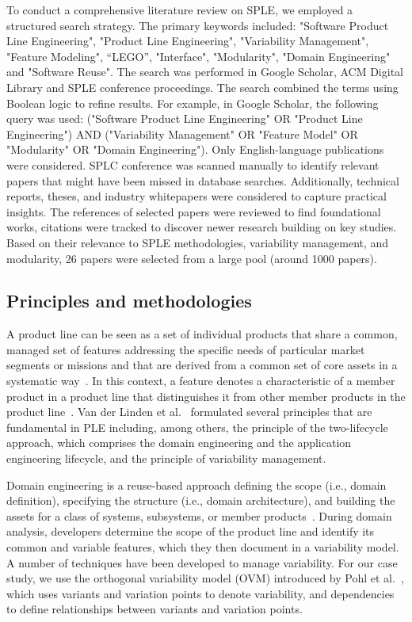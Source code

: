 \documentclass[sigconf,review]{acmart}
\begin{document}
To conduct a comprehensive literature review on SPLE, we employed a structured search strategy. 
The primary keywords included: "Software Product Line Engineering", "Product Line Engineering", "Variability Management", "Feature Modeling", “LEGO”, "Interface", "Modularity", "Domain Engineering" and "Software Reuse". 
The search was performed in Google Scholar, ACM Digital Library and SPLE conference proceedings. 
The search combined the terms using Boolean logic to refine results. 
For example, in Google Scholar, the following query was used: ("Software Product Line Engineering" OR "Product Line Engineering") AND ("Variability Management" OR "Feature Model" OR "Modularity" OR "Domain Engineering"). 
Only English-language publications were considered. 
SPLC conference was scanned manually to identify relevant papers that might have been missed in database searches. 
Additionally, technical reports, theses, and industry whitepapers were considered to capture practical insights. 
The references of selected papers were reviewed to find foundational works, citations were tracked to discover newer research building on key studies. 
Based on their relevance to SPLE methodologies, variability management, and modularity, 26 papers were selected from a large pool (around 1000 papers).


\subsection{Principles and methodologies}
\label{sec:principles}

A product line can be seen as a set of individual products that share a common, managed set of features addressing the specific needs of particular market segments or missions and that are derived from a common set of core assets in a systematic way~\cite{Clements_2002}.
In this context, a feature denotes a characteristic of a member product in a product line that distinguishes it from other member products in the product line~\cite{ISO/IEC_26550}.
Van der Linden et al.~\cite{Linden_2007} formulated several principles that are fundamental in PLE including, among others, the principle of the two-lifecycle approach, which comprises the domain engineering and the application engineering lifecycle, and the principle of variability management.

Domain engineering is a reuse-based approach defining the scope (i.e., domain definition), specifying the structure (i.e., domain architecture), and building the assets for a class of systems, subsystems, or member products~\cite{ISO/IEC_26550}.
During domain analysis, developers determine the scope of the product line and identify its common and variable features, which they then document in a variability model. 
A number of techniques have been developed to manage variability.
For our case study, we use the orthogonal variability model (OVM) introduced by Pohl et al.~\cite{Pohl_2005}, which uses variants and variation points to denote variability, and dependencies to define relationships between variants and variation points.
\end{document}

